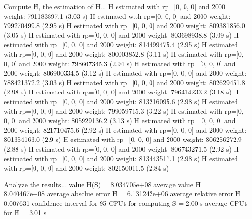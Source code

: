Compute H̃, the estimation of H...
  H estimated with rp=[0, 0, 0] and 2000 weight:  791183897.1  (3.03 s)
  H estimated with rp=[0, 0, 0] and 2000 weight:  799270499.8  (2.95 s)
  H estimated with rp=[0, 0, 0] and 2000 weight:  809381856.0  (3.05 s)
  H estimated with rp=[0, 0, 0] and 2000 weight:  803698938.8  (3.09 s)
  H estimated with rp=[0, 0, 0] and 2000 weight:  814499475.4  (2.95 s)
  H estimated with rp=[0, 0, 0] and 2000 weight:  800003852.8  (3.11 s)
  H estimated with rp=[0, 0, 0] and 2000 weight:  798667345.3  (2.94 s)
  H estimated with rp=[0, 0, 0] and 2000 weight:  806900334.5  (3.12 s)
  H estimated with rp=[0, 0, 0] and 2000 weight:  788421372.2  (3.03 s)
  H estimated with rp=[0, 0, 0] and 2000 weight:  802629451.8  (2.98 s)
  H estimated with rp=[0, 0, 0] and 2000 weight:  796414233.2  (3.18 s)
  H estimated with rp=[0, 0, 0] and 2000 weight:  813216095.6  (2.98 s)
  H estimated with rp=[0, 0, 0] and 2000 weight:  799059715.3  (3.22 s)
  H estimated with rp=[0, 0, 0] and 2000 weight:  805929136.2  (3.13 s)
  H estimated with rp=[0, 0, 0] and 2000 weight:  821710475.6  (2.92 s)
  H estimated with rp=[0, 0, 0] and 2000 weight:  801354163.0  (2.9 s)
  H estimated with rp=[0, 0, 0] and 2000 weight:  806256272.9  (2.88 s)
  H estimated with rp=[0, 0, 0] and 2000 weight:  806743271.5  (2.92 s)
  H estimated with rp=[0, 0, 0] and 2000 weight:  813443517.1  (2.98 s)
  H estimated with rp=[0, 0, 0] and 2000 weight:  802150011.5  (2.84 s)

Analyze the results...
  value H(S)                  = 8.034705e+08 
  average value H̃             = 8.040467e+08 
  average absolue error H̃     = 6.131242e+06 
  average relative error H̃    = 0.007631 
  confidence interval for 95%
  CPUt for computing S         = 2.00 s
  average CPUt for H̃           = 3.01 s


